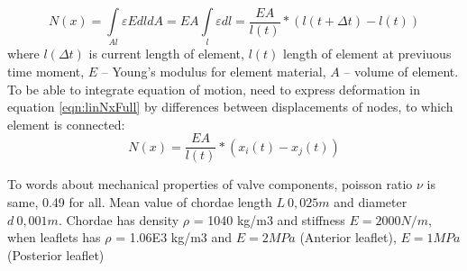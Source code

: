 \begin{equation}\label{eqn:linNxFull}
  N(x)= \int\limits_{Al} \varepsilon EdldA=EA\int\limits_l \varepsilon dl=\frac{EA}{l(t)}*(l(t + \Delta t)-l(t))
\end{equation}
where $l(\Delta t)$ is current length of element, $l(t)$ length of element at previuous time moment,
$E$ – Young’s modulus for element material, $A$ – volume of element. To be able to integrate
equation of motion, need to express deformation in equation \eqref{eqn:linNxFull} by differences
between displacements of nodes, to which element is connected:
\begin{equation}\label{eqn:linNxWdispl}
  N(x)=\frac{EA}{l(t)}*(x_{i}(t)-x_{j}(t))
\end{equation}\par
To words about mechanical properties of valve components, poisson ratio $\nu$ is same, 0.49 for all.
Mean value of chordae length $L ~ 0,025 m$ and diameter $d ~ 0,001 m$. Chordae has density $\rho$
= 1040 kg/m3 and stiffness $E = 2000 N/m$, when leaflets has $\rho$ = 1.06E3 kg/m3 and 
$E = 2 MPa$ (Anterior leaflet), $E = 1 MPa$ (Posterior leaflet)\par
